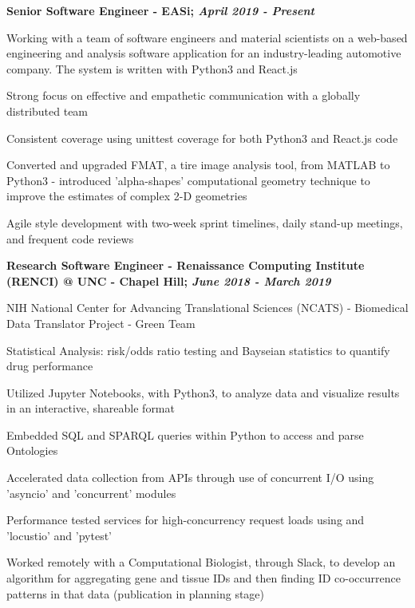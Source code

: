 \documentclass[letterpaper,final]{memoir}
\newcommand{\Sep}{\vspace{1.0em}}
\newcommand{\SmallSep}{\vspace{0.4em}}
\newcommand{\CVItem}[1]
	{\textbf{\color{Blue} #1}}
\begin{document}
\CVItem{Senior Software Engineer - EASi; \textit{April 2019 - Present}}
\begin{compactitem}[\color{Blue}$\circ$]
    \SmallSep
    \item Working with a team of software
    engineers and material scientists on a web-based engineering
    and analysis software application for an industry-leading automotive company. The system is written with Python3 and React.js
    \SmallSep
    \item Strong focus on effective and empathetic communication with a globally distributed team
    \SmallSep
    \item Consistent coverage using unittest coverage for both Python3 and React.js code
    \SmallSep
    \item Converted and upgraded FMAT, a tire image analysis tool, from MATLAB to Python3 - introduced
    \newline
    'alpha-shapes' computational geometry technique to improve the estimates of complex 2-D geometries
    \SmallSep
    \item Agile style development with two-week sprint timelines, daily stand-up meetings, and frequent code reviews

\end{compactitem}

\Sep

\CVItem{Research Software Engineer - Renaissance Computing Institute (RENCI) @ UNC - Chapel Hill; \textit{June 2018 - March 2019}}
\begin{compactitem}[\color{Blue}$\circ$]
    \SmallSep
    \item NIH National Center for Advancing Translational Sciences (NCATS) - Biomedical Data Translator Project - Green Team
    \SmallSep
    \item Statistical Analysis: risk/odds ratio testing and Bayseian statistics to quantify drug performance
    \SmallSep
    \item Utilized Jupyter Notebooks, with Python3, to analyze data and visualize results in an interactive, shareable format
    \SmallSep
    \item Embedded SQL and SPARQL queries within Python to access and parse Ontologies
    \SmallSep
    \item Accelerated data collection from APIs through use of concurrent I/O using 'asyncio' and 'concurrent' modules
    \SmallSep
    \item Performance tested services for high-concurrency request loads using and 'locustio' and 'pytest'
    \SmallSep
    \item Worked remotely with a Computational Biologist, through Slack, to develop an algorithm for
    aggregating gene and tissue IDs and then finding ID co-occurrence patterns in that data (publication in planning stage)

\end{compactitem}
\end{document}

